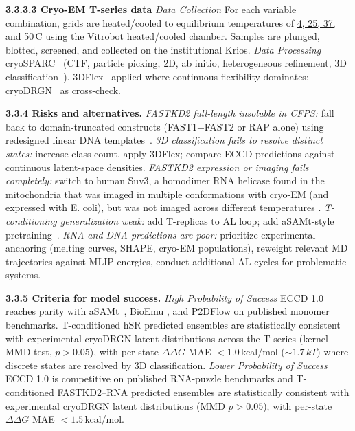 \documentclass[11pt]{article}
\newcommand{\ECCD}{ECCD\xspace}
\begin{document}
\textbf{3.3.3.3 Cryo-EM T-series data} \emph{Data Collection} For each variable combination, grids are heated/cooled to equilibrium temperatures of \uline{4, 25, 37, and 50\,\textdegree C} using the Vitrobot heated/cooled chamber. Samples are plunged, blotted, screened, and collected on the institutional Krios. \emph{Data Processing} cryoSPARC~\cite{punjani_cryoSPARC_2017} (CTF, particle picking, 2D, ab initio, heterogeneous refinement, 3D classification~\cite{punjani_3DVA_2021}). 3DFlex~\cite{punjani_3DFlex_2023} applied where continuous flexibility dominates; cryoDRGN~\cite{zhong_CryoDRGN_2021} as cross-check.

\textbf{3.3.4 Risks and alternatives.} \emph{FASTKD2 full-length insoluble in CFPS:} fall back to domain-truncated constructs (FAST1+FAST2 or RAP alone) using redesigned linear DNA templates~\cite{popow_FASTKD2_2015}. \emph{3D classification fails to resolve distinct states:} increase class count, apply 3DFlex; compare \ECCD predictions against continuous latent-space densities. \emph{FASTKD2 expression or imaging fails completely:} switch to human Suv3, a homodimer RNA helicase found in the mitochondria that was imaged in multiple conformations with cryo-EM (and expressed with E. coli), but was not imaged across different temperatures \cite{patra_Asymmetric_2026}. \emph{T-conditioning generalization weak:} add T-replicas to AL loop; add aSAMt-style pretraining~\cite{janson_Deep_2025a}. \emph{RNA and DNA predictions are poor:} prioritize experimental anchoring (melting curves, SHAPE, cryo-EM populations), reweight relevant MD trajectories against MLIP energies, conduct additional AL cycles for problematic systems.

\textbf{3.3.5 Criteria for model success.} \emph{High Probability of Success} \ECCD 1.0 reaches parity with aSAMt~\cite{janson_Deep_2025a}, BioEmu \cite{lewis_Scalable_2025}, and P2DFlow \cite{jin_P2DFlow_2025} on published monomer benchmarks. T-conditioned hSR predicted ensembles are statistically consistent with experimental cryoDRGN latent distributions across the T-series (kernel MMD test, $p > 0.05$), with per-state $\Delta\Delta G$ MAE $< 1.0$\,kcal/mol (${\sim}1.7\,kT$) where discrete states are resolved by 3D classification. \emph{Lower Probability of Success} \ECCD 1.0 is competitive on published RNA-puzzle benchmarks and T-conditioned FASTKD2--RNA predicted ensembles are statistically consistent with experimental cryoDRGN latent distributions (MMD $p > 0.05$), with per-state $\Delta\Delta G$ MAE $< 1.5$\,kcal/mol.
\end{document}
